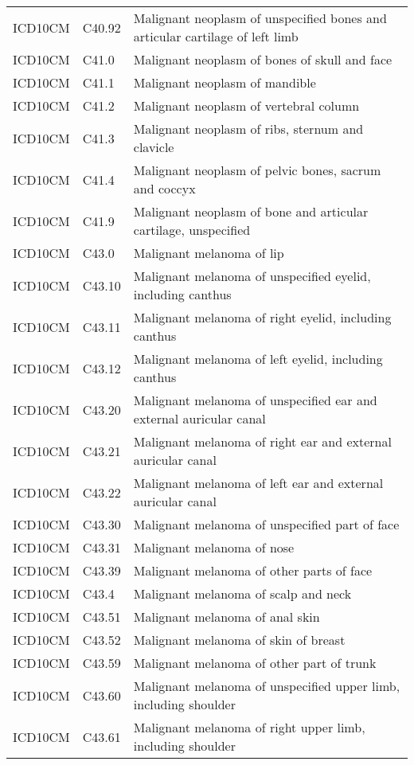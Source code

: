 \begin{longtable}{p{}p{}p{}}
  ICD10CM & C40.92 & Malignant neoplasm of unspecified bones and articular cartilage of left limb \\ 
  ICD10CM & C41.0 & Malignant neoplasm of bones of skull and face \\ 
  ICD10CM & C41.1 & Malignant neoplasm of mandible \\ 
  ICD10CM & C41.2 & Malignant neoplasm of vertebral column \\ 
  ICD10CM & C41.3 & Malignant neoplasm of ribs, sternum and clavicle \\ 
  ICD10CM & C41.4 & Malignant neoplasm of pelvic bones, sacrum and coccyx \\ 
  ICD10CM & C41.9 & Malignant neoplasm of bone and articular cartilage, unspecified \\ 
  ICD10CM & C43.0 & Malignant melanoma of lip \\ 
  ICD10CM & C43.10 & Malignant melanoma of unspecified eyelid, including canthus \\ 
  ICD10CM & C43.11 & Malignant melanoma of right eyelid, including canthus \\ 
  ICD10CM & C43.12 & Malignant melanoma of left eyelid, including canthus \\ 
  ICD10CM & C43.20 & Malignant melanoma of unspecified ear and external auricular canal \\ 
  ICD10CM & C43.21 & Malignant melanoma of right ear and external auricular canal \\ 
  ICD10CM & C43.22 & Malignant melanoma of left ear and external auricular canal \\ 
  ICD10CM & C43.30 & Malignant melanoma of unspecified part of face \\ 
  ICD10CM & C43.31 & Malignant melanoma of nose \\ 
  ICD10CM & C43.39 & Malignant melanoma of other parts of face \\ 
  ICD10CM & C43.4 & Malignant melanoma of scalp and neck \\ 
  ICD10CM & C43.51 & Malignant melanoma of anal skin \\ 
  ICD10CM & C43.52 & Malignant melanoma of skin of breast \\ 
  ICD10CM & C43.59 & Malignant melanoma of other part of trunk \\ 
  ICD10CM & C43.60 & Malignant melanoma of unspecified upper limb, including shoulder \\ 
  ICD10CM & C43.61 & Malignant melanoma of right upper limb, including shoulder \\ 

\end{longtable}
